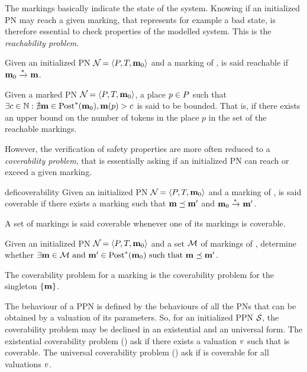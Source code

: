 The markings basically indicate the state of the system.
Knowing if an initialized \ac{PN} may reach a given marking, that represents for example a bad state, is therefore essential to check properties of the modelled system.
This is the \emph{reachability problem}.

\begin{defi}[Reachability]
  Given an initialized \ac{PN} $\defPN$ and a marking \mar of \namePN, \mar is said reachable if $\mathbf{m}_0 \xrightarrow{*}_{} \mathbf{m}$.
\end{defi}

\begin{defi}
  \label{defi:place-boundedness}
  Given a marked PN $\defPN$,
  a place $p \in P$ such that $\exists c \in \mathbb{N} : \nexists \mathbf{m} \in \operatorname{Post}^*_{{}}(\mathbf{m}_0), \mathbf{m}(p) > c$ is said to be bounded.
  That is, if there exists an upper bound on the number of tokens in the place $p$ in the set of the reachable markings.
\end{defi}

However, the verification of safety properties are more often reduced to a \emph{coverability problem}, that is essentially asking if an initialized \ac{PN} can reach or exceed a given marking.

\begin{restatable}[Coverability]{defi}{coverability}
  Given an initialized \ac{PN} $\defPN$ and a marking \mar of \namePN, \mar is said coverable if there exists a marking \marp such that $\mathbf{m} \preceq \mathbf{m'}$ and $\mathbf{m}_0 \xrightarrow{*}_{} \mathbf{m'}$.

  A set of markings is said coverable whenever one of its markings is coverable.
\end{restatable}

\begin{defi}
  Given an initialized \ac{PN} $\defPN$ and a set $\mathcal{M}$ of markings of \namePN, determine whether $\exists \mathbf{m} \in \mathcal{M} \text{ and } \mathbf{m'} \in \operatorname{Post}^*_{{}}(\mathbf{m}_0) \text{ such that } \mathbf{m} \preceq \mathbf{m'}$.

  The coverability problem for a marking \mar is the coverability problem for the singleton $\{\mathbf{m}\}$.
\end{defi}

The behaviour of a \ac{PPN} is defined by the behaviours of all the \acp{PN} that can be obtained by a valuation of its parameters.
So, for an initialized \ac{PPN} $\mathcal{S}_{{}}$, the coverability problem may be declined in an existential and an universal form.
The existential coverability problem (\Ecov) ask if there exists a valuation $\val$ such that \mar is coverable.
The universal coverability problem (\Ucov) ask if \mar is coverable for all valuations $\val$.

